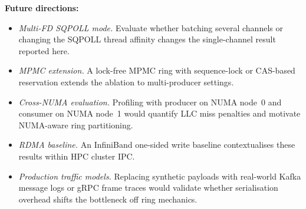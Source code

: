 \documentclass[10pt,conference]{IEEEtran}
\begin{document}
\textbf{Future directions:}
\begin{itemize}
  \item \emph{Multi-FD SQPOLL mode.}  Evaluate whether batching several
        channels or changing the SQPOLL thread affinity changes the
        single-channel result reported here.
  \item \emph{MPMC extension.}  A lock-free MPMC ring with sequence-lock or
        CAS-based reservation extends the ablation to multi-producer settings.
  \item \emph{Cross-NUMA evaluation.}  Profiling with producer on NUMA node~0
        and consumer on NUMA node~1 would quantify LLC miss penalties and
        motivate NUMA-aware ring partitioning.
  \item \emph{RDMA baseline.}  An InfiniBand one-sided write baseline
        contextualises these results within HPC cluster IPC.
  \item \emph{Production traffic models.}  Replacing synthetic payloads with
        real-world Kafka message logs or gRPC frame traces would validate
        whether serialisation overhead shifts the bottleneck off ring mechanics.
\end{itemize}
\end{document}
